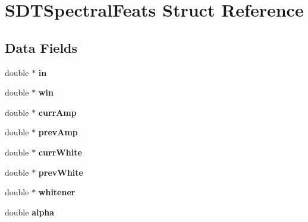 \hypertarget{struct_s_d_t_spectral_feats}{}\section{S\+D\+T\+Spectral\+Feats Struct Reference}
\label{struct_s_d_t_spectral_feats}
\subsection*{Data Fields}
\begin{DoxyCompactItemize}
\item 
\hypertarget{struct_s_d_t_spectral_feats_a88b879aa32e1373f5e19154d3d583fd3}{}double $\ast$ {\bfseries in}\label{struct_s_d_t_spectral_feats_a88b879aa32e1373f5e19154d3d583fd3}

\item 
\hypertarget{struct_s_d_t_spectral_feats_a0db7743ca63ebec1838ca74753ac8894}{}double $\ast$ {\bfseries win}\label{struct_s_d_t_spectral_feats_a0db7743ca63ebec1838ca74753ac8894}

\item 
\hypertarget{struct_s_d_t_spectral_feats_a012edcd87e9c8899708157d83f284b9a}{}double $\ast$ {\bfseries curr\+Amp}\label{struct_s_d_t_spectral_feats_a012edcd87e9c8899708157d83f284b9a}

\item 
\hypertarget{struct_s_d_t_spectral_feats_ae7470aba6609ab02521c6c9f34d2c9ff}{}double $\ast$ {\bfseries prev\+Amp}\label{struct_s_d_t_spectral_feats_ae7470aba6609ab02521c6c9f34d2c9ff}

\item 
\hypertarget{struct_s_d_t_spectral_feats_aa14d5a11fddae2e97e425a25a8619e64}{}double $\ast$ {\bfseries curr\+White}\label{struct_s_d_t_spectral_feats_aa14d5a11fddae2e97e425a25a8619e64}

\item 
\hypertarget{struct_s_d_t_spectral_feats_aeaa6a3ec194b9e12de3fa51d511f0c09}{}double $\ast$ {\bfseries prev\+White}\label{struct_s_d_t_spectral_feats_aeaa6a3ec194b9e12de3fa51d511f0c09}

\item 
\hypertarget{struct_s_d_t_spectral_feats_acdcf7112c07d2fa8ab9521fd664ac880}{}double $\ast$ {\bfseries whitener}\label{struct_s_d_t_spectral_feats_acdcf7112c07d2fa8ab9521fd664ac880}

\item 
\hypertarget{struct_s_d_t_spectral_feats_a20f4c4490bc8ecbdd1ffcb79acce6035}{}double {\bfseries alpha}\label{struct_s_d_t_spectral_feats_a20f4c4490bc8ecbdd1ffcb79acce6035}


\end{DoxyCompactItemize}
